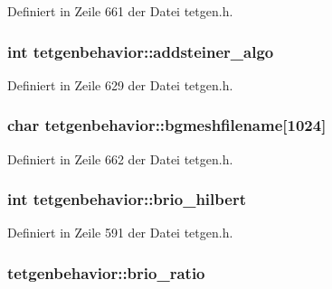 Definiert in Zeile 661 der Datei tetgen.\-h.

\hypertarget{classtetgenbehavior_a660e5666e236d2e0fbd127fd56c9c493}{
\subsubsection[{addsteiner\-\_\-algo}]{\setlength{\rightskip}{0pt plus 5cm}int tetgenbehavior\-::addsteiner\-\_\-algo}}\label{classtetgenbehavior_a660e5666e236d2e0fbd127fd56c9c493}


Definiert in Zeile 629 der Datei tetgen.\-h.

\hypertarget{classtetgenbehavior_ae72a1c6b8d7389d4fad21fa584207aba}{
\subsubsection[{bgmeshfilename}]{\setlength{\rightskip}{0pt plus 5cm}char tetgenbehavior\-::bgmeshfilename\mbox{[}1024\mbox{]}}}\label{classtetgenbehavior_ae72a1c6b8d7389d4fad21fa584207aba}


Definiert in Zeile 662 der Datei tetgen.\-h.

\hypertarget{classtetgenbehavior_a26ae57c732cb3e74a94355c9a74c1612}{
\subsubsection[{brio\-\_\-hilbert}]{\setlength{\rightskip}{0pt plus 5cm}int tetgenbehavior\-::brio\-\_\-hilbert}}\label{classtetgenbehavior_a26ae57c732cb3e74a94355c9a74c1612}


Definiert in Zeile 591 der Datei tetgen.\-h.

\hypertarget{classtetgenbehavior_a3aad13e8567253dd2d2b2e95a4e38ee9}{
\subsubsection[{brio\-\_\-ratio}]{ tetgenbehavior\-::brio\-\_\-ratio}}\label{classtetgenbehavior_a3aad13e8567253dd2d2b2e95a4e38ee9}


